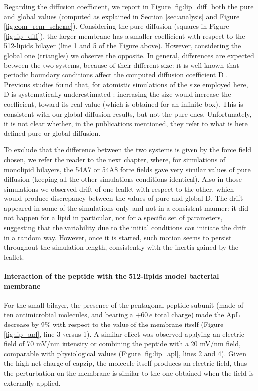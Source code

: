 Regarding the diffusion coefficient, we report in Figure \ref{fig:lip_diff} both the pure and global values (computed as explained in Section \ref{sec:analysis} and Figure \ref{fig:com_rem_scheme}).
%
Considering the pure diffusion (squares in Figure \ref{fig:lip_diff}), the larger membrane has a smaller coefficient with respect to the 512-lipids bilayer (line 1 and 5 of the Figure above). However, considering the global one (triangles) we observe the opposite.
%
In general, differences are expected between the two systems, because of their different size: it is well known that periodic boundary conditions affect the computed diffusion coefficient D \citep{Camley2015,Venable2017}. Previous studies found that, for atomistic simulations of the size employed here, D is systematically underestimated \citep{Camley2015}: increasing the size would increase the coefficient, toward its real value (which is obtained for an infinite box). This is consistent with our global diffusion results, but not the pure ones. Unfortunately, it is not clear whether, in the publications mentioned, they refer to what is here defined pure or global diffusion.

To exclude that the difference between the two systems is given by the force field chosen, we refer the reader to the next chapter, where, for simulations of monolipid bilayers, the 54A7 or 54A8 force fields gave very similar values of pure diffusion (keeping all the other simulations conditions identical).
%
Also in those simulations we observed drift of one leaflet with respect to the other, which would produce discrepancy between the values of pure and global D. The drift appeared in some of the simulations only, and not in a consistent manner: it did not happen for a lipid in particular, nor for a specific set of parameters, suggesting that the variability due to the initial conditions can initiate the drift in a random way.
However, once it is started, such motion seems to persist throughout the simulation length, consistently with the inertia gained by the leaflet.


\paragraph{Interaction of the peptide with the 512-lipids model bacterial membrane}
For the small bilayer, the presence of the pentagonal peptide subunit (made of ten antimicrobial molecules, and bearing a $+60\,e$ total charge) made the ApL decrease by 9\% with respect to the value of the membrane itself (Figure \ref{fig:lip_apl}, line 3 versus 1).
%
A similar effect was observed applying an electric field of 70 mV/nm intensity or combining the peptide with a 20 mV/nm field, comparable with physiological values (Figure \ref{fig:lip_apl}, lines 2 and 4).
%
Given the high net charge of capzip, the molecule itself produces an electric field, thus the perturbation on the membrane is similar to the one obtained when the field is externally applied.

